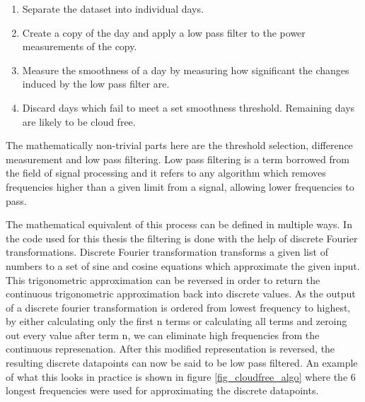 





\begin{enumerate}
  \item Separate the dataset into individual days.
  
  \item Create a copy of the day and apply a low pass filter to the power measurements of the copy.
  
  \item Measure the smoothness of a day by measuring how significant the changes induced by the low pass filter are.
  
  \item Discard days which fail to meet a set smoothness threshold. Remaining days are likely to be cloud free.
  
  
  
\end{enumerate}



\noindent The mathematically non-trivial parts here are the threshold selection, difference measurement and low pass filtering. Low pass filtering is a term borrowed from the field of signal processing and it refers to any algorithm which removes frequencies higher than a given limit from a signal, allowing lower frequencies to pass. 

The mathematical equivalent of this process can be defined in multiple ways. In the code used for this thesis the filtering is done with the help of discrete Fourier transformations. Discrete Fourier transformation transforms a given list of numbers to a set of sine and cosine equations which approximate the given input. This trigonometric approximation can be reversed in order to return the continuous trigonometric approximation back into discrete values. As the output of a discrete fourier transformation is ordered from lowest frequency to highest, by either calculating only the first n terms or calculating all terms and zeroing out every value after term n, we can eliminate high frequencies from the continuous represenation. After this modified representation is reversed, the resulting discrete datapoints can now be said to be low pass filtered. An example of what this looks in practice is shown in figure \ref{fig_cloudfree_algo} where the 6 longest frequencies were used for approximating the discrete datapoints. 


